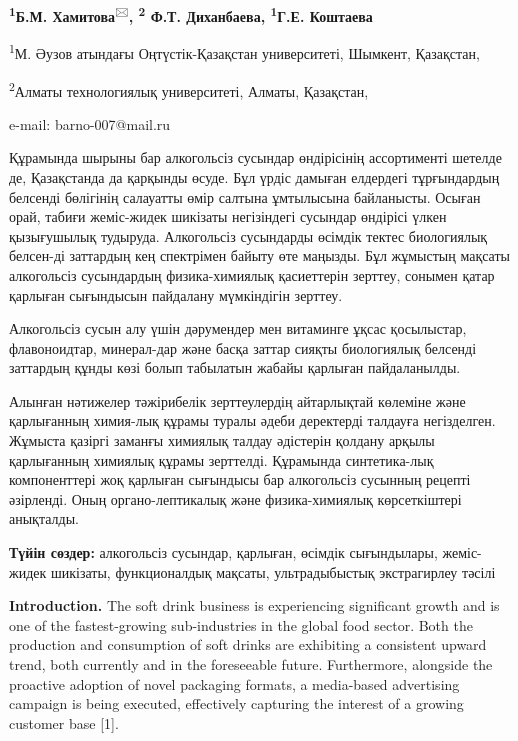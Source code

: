 \begin{center}

{\bfseries \textsuperscript{1}Б.М. Хамитова}\textsuperscript{🖂}{\bfseries ,
\textsuperscript{2} Ф.Т. Диханбаева, \textsuperscript{1}Г.Е. Коштаева}

\textsuperscript{1}М. Әузов атындағы Оңтүстік-Қазақстан университеті,
Шымкент, Қазақстан,

\textsuperscript{2}Алматы технологиялық университеті, Алматы, Қазақстан,

e-mail: barno-007@mail.ru
\end{center}

Құрамында шырыны бар алкогольсіз сусындар өндірісінің ассортименті
шетелде де, Қазақстанда да қарқынды өсуде. Бұл үрдіс дамыған елдердегі
тұрғындардың белсенді бөлігінің салауатты өмір салтына ұмтылысына
байланысты. Осыған орай, табиғи жеміс-жидек шикізаты негізіндегі
сусындар өндірісі үлкен қызығушылық тудыруда. Алкогольсіз сусындарды
өсімдік тектес биологиялық белсен-ді заттардың кең спектрімен байыту өте
маңызды. Бұл жұмыстың мақсаты алкогольсіз сусындардың физика-химиялық
қасиеттерін зерттеу, сонымен қатар қарлыған сығындысын пайдалану
мүмкіндігін зерттеу.

Алкогольсіз сусын алу үшін дәрумендер мен витаминге ұқсас қосылыстар,
флавоноидтар, минерал-дар және басқа заттар сияқты биологиялық белсенді
заттардың құнды көзі болып табылатын жабайы қарлыған пайдаланылды.

Алынған нәтижелер тәжірибелік зерттеулердің айтарлықтай көлеміне және
қарлығанның химия-лық құрамы туралы әдеби деректерді талдауға
негізделген. Жұмыста қазіргі заманғы химиялық талдау әдістерін қолдану
арқылы қарлығанның химиялық құрамы зерттелді. Құрамында синтетика-лық
компоненттері жоқ қарлыған сығындысы бар алкогольсіз сусынның рецепті
әзірленді. Оның органо-лептикалық және физика-химиялық көрсеткіштері
анықталды.

{\bfseries Түйін сөздер:} алкогольсіз сусындар, қарлыған, өсімдік
сығындылары, жеміс-жидек шикізаты, функционалдық мақсаты, ультрадыбыстық
экстрагирлеу тәсілі

{\bfseries Introduction.} The soft drink business is experiencing
significant growth and is one of the fastest-growing sub-industries in
the global food sector. Both the production and consumption of soft
drinks are exhibiting a consistent upward trend, both currently and in
the foreseeable future. Furthermore, alongside the proactive adoption of
novel packaging formats, a media-based advertising campaign is being
executed, effectively capturing the interest of a growing customer base
{[}1{]}.

